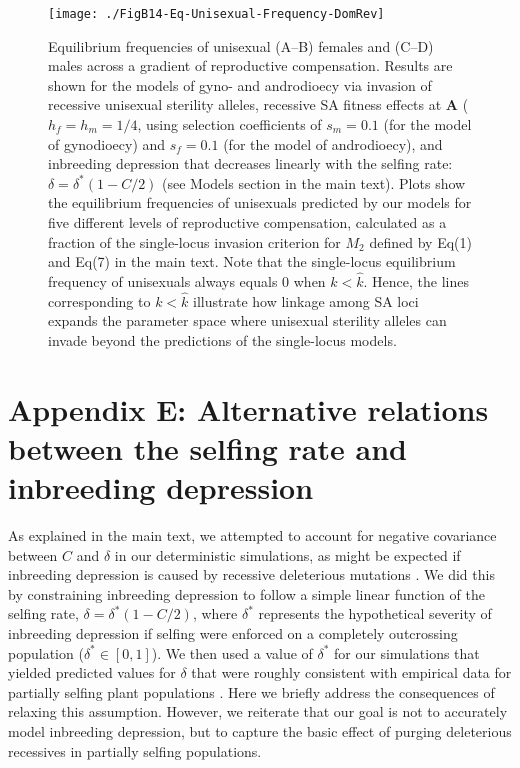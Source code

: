 \documentclass{article}
\begin{document}
\begin{figure}[ht!]
\centering
\texttt{[image: ./FigB14-Eq-Unisexual-Frequency-DomRev]}
\caption{Equilibrium frequencies of unisexual (A--B) females and (C--D) males across a gradient of reproductive compensation. Results are shown for the models of gyno- and androdioecy via invasion of recessive unisexual sterility alleles, recessive SA fitness effects at $\mathbf{A}$ ($h_f = h_m = 1/4$, using selection coefficients of $s_m = 0.1$ (for the model of gynodioecy) and $s_f = 0.1$ (for the model of androdioecy), and inbreeding depression that decreases linearly with the selfing rate: $\delta = \delta^\ast(1 - C/2)$ (see Models section in the main text). Plots show the equilibrium frequencies of unisexuals predicted by our models for five different levels of reproductive compensation, calculated as a fraction of the single-locus invasion criterion for $M_2$ defined by Eq(1) and Eq(7) in the main text. Note that the single-locus equilibrium frequency of unisexuals always equals $0$ when $k < \hat{k}$. Hence, the lines corresponding to $k < \hat{k}$ illustrate how linkage among SA loci expands the parameter space where unisexual sterility alleles can invade beyond the predictions of the single-locus models.}
\label{fig:eqFreqDomRev}
\end{figure}
\newpage{}

\FloatBarrier

\section*{Appendix E: Alternative relations between the selfing rate and inbreeding depression}
\renewcommand{\theequation}{E\arabic{equation}}
\setcounter{equation}{0}
\renewcommand{\thefigure}{E\arabic{figure}}
\setcounter{figure}{0}

As explained in the main text, we attempted to account for negative covariance between $C$ and $\delta$ in our deterministic simulations, as might be expected if inbreeding depression is caused by recessive deleterious mutations \citep{Charlesworth1987, Charlesworth2009}. We did this by constraining inbreeding depression to follow a simple linear function of the selfing rate, $\delta = \delta^\ast(1 - C/2)$, where $\delta^\ast$ represents the hypothetical severity of inbreeding depression if selfing were enforced on a completely outcrossing population ($\delta^\ast \in [0,1]$). We then used a value of $\delta^{\ast}$ for our simulations that yielded predicted values for $\delta$ that were roughly consistent with empirical data for partially selfing plant populations \citep{HusbandSchemske1996}. Here we briefly address the consequences of relaxing this assumption. However, we reiterate that our goal is not to accurately model inbreeding depression, but to capture the basic effect of purging deleterious recessives in partially selfing populations. 
\end{document}

